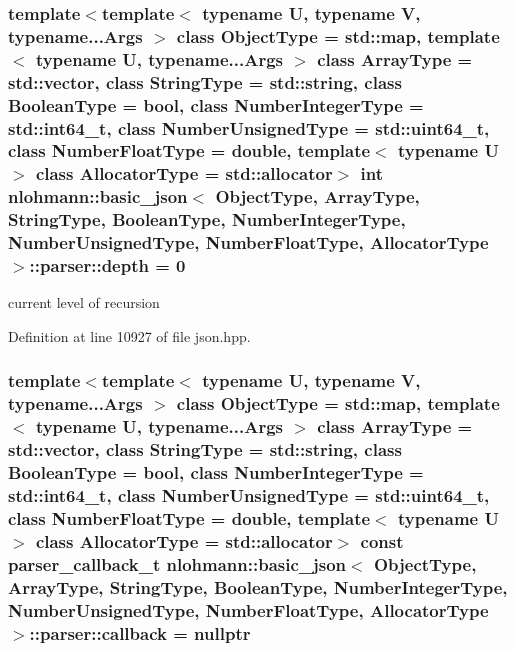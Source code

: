 \subsubsection[{depth}]{\setlength{\rightskip}{0pt plus 5cm}template$<$template$<$ typename U, typename V, typename...\+Args $>$ class Object\+Type = std\+::map, template$<$ typename U, typename...\+Args $>$ class Array\+Type = std\+::vector, class String\+Type  = std\+::string, class Boolean\+Type  = bool, class Number\+Integer\+Type  = std\+::int64\+\_\+t, class Number\+Unsigned\+Type  = std\+::uint64\+\_\+t, class Number\+Float\+Type  = double, template$<$ typename U $>$ class Allocator\+Type = std\+::allocator$>$ int {\bf nlohmann\+::basic\+\_\+json}$<$ Object\+Type, Array\+Type, String\+Type, Boolean\+Type, Number\+Integer\+Type, Number\+Unsigned\+Type, Number\+Float\+Type, Allocator\+Type $>$\+::parser\+::depth = 0\hspace{0.3cm}{\ttfamily [private]}}\label{classnlohmann_1_1basic__json_1_1parser_a8380d4d5ce79ab1ec9435c843fd40b07}


current level of recursion 



Definition at line 10927 of file json.\+hpp.

\hypertarget{classnlohmann_1_1basic__json_1_1parser_a1ddac33be60094b071f95a1010382654}{}
\subsubsection[{callback}]{\setlength{\rightskip}{0pt plus 5cm}template$<$template$<$ typename U, typename V, typename...\+Args $>$ class Object\+Type = std\+::map, template$<$ typename U, typename...\+Args $>$ class Array\+Type = std\+::vector, class String\+Type  = std\+::string, class Boolean\+Type  = bool, class Number\+Integer\+Type  = std\+::int64\+\_\+t, class Number\+Unsigned\+Type  = std\+::uint64\+\_\+t, class Number\+Float\+Type  = double, template$<$ typename U $>$ class Allocator\+Type = std\+::allocator$>$ const {\bf parser\+\_\+callback\+\_\+t} {\bf nlohmann\+::basic\+\_\+json}$<$ Object\+Type, Array\+Type, String\+Type, Boolean\+Type, Number\+Integer\+Type, Number\+Unsigned\+Type, Number\+Float\+Type, Allocator\+Type $>$\+::parser\+::callback = nullptr\hspace{0.3cm}{\ttfamily [private]}}\label{classnlohmann_1_1basic__json_1_1parser_a1ddac33be60094b071f95a1010382654}



